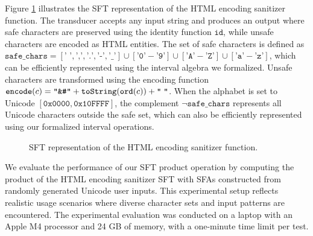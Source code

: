 Figure \ref{fig:html-sanitizer-sft} illustrates the SFT representation of the HTML encoding sanitizer function. The transducer accepts any input string and produces an output where safe characters are preserved using the identity function $\texttt{id}$, while unsafe characters are encoded as HTML entities. The set of safe characters is defined as $\texttt{safe\_chars} = [\texttt{' '}, \texttt{','}, \texttt{'.'}, \texttt{'-'}, \texttt{'\_'}] \cup [\texttt{'0'}-\texttt{'9'}] \cup [\texttt{'A'}-\texttt{'Z'}] \cup [\texttt{'a'}-\texttt{'z'}]$, which can be efficiently represented using the interval algebra we formalized. Unsafe characters are transformed using the encoding function $\texttt{encode}(c) = \texttt{``\&\#''} + \texttt{toString}(\texttt{ord}(c)) + \texttt{``\;''}$. When the alphabet is set to Unicode $[\mathtt{0x0000}, \mathtt{0x10FFFF}]$, the complement $\neg\texttt{safe\_chars}$ represents all Unicode characters outside the safe set, which can also be efficiently represented using our formalized interval operations.
\begin{figure}[htbp]
\centering
{}
\caption{SFT representation of the HTML encoding sanitizer function.}
\label{fig:html-sanitizer-sft}
\end{figure}

We evaluate the performance of our SFT product operation by computing the product of the HTML encoding sanitizer SFT with SFAs constructed from randomly generated Unicode user inputs. This experimental setup reflects realistic usage scenarios where diverse character sets and input patterns are encountered. The experimental evaluation was conducted on a laptop with an Apple M4 processor and 24 GB of memory, with a one-minute time limit per test.

